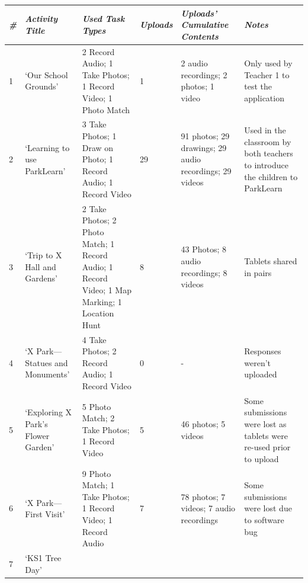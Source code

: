 \begin{table}[]
    \centering
    \begin{tabularx}{\linewidth}{ 
| p{4mm} 
| >{\raggedright\arraybackslash}X 
| >{\raggedright\arraybackslash}X 
| p{13mm}
| >{\raggedright\arraybackslash}X 
| >{\raggedright\arraybackslash}X 
|}
\hline
\small\textit{\#}
    & \small\textit{Activity Title} 
    & \small\textit{Used Task Types}
    & \small\textit{Uploads}
    & \small\textit{Uploads' Cumulative Contents}
    & \small\textit{Notes}\\
\hline
\small 1 
    & \footnotesize `Our School Grounds' 
    & \footnotesize 2 Record Audio; 1 Take Photos; 1 Record Video; 1 Photo Match 
    & \footnotesize 1  
    & \footnotesize 2 audio recordings; 2 photos; 1 video
    & \footnotesize Only used by Teacher 1 to test the application\\
\hline
\small 2
    & \footnotesize `Learning to use ParkLearn' 
    & \footnotesize 3 Take Photos; 1 Draw on Photo; 1 Record Audio; 1 Record Video 
    & \footnotesize 29  
    & \footnotesize 91 photos; 29 drawings; 29 audio recordings; 29 videos
    & \footnotesize Used in the classroom by both teachers to introduce the children to ParkLearn\\
\hline
\small 3
    & \footnotesize `Trip to X Hall and Gardens' 
    & \footnotesize 2 Take Photos; 2 Photo Match; 1 Record Audio; 1 Record Video; 1 Map Marking; 1 Location Hunt 
    & \footnotesize 8  
    & \footnotesize 43 Photos; 8 audio recordings; 8 videos
    & \footnotesize Tablets shared in pairs\\
\hline
\small 4 
    & \footnotesize `X Park---Statues and Monuments' 
    & \footnotesize 4 Take Photos; 2 Record Audio; 1 Record Video
    & \footnotesize 0  
    & \footnotesize -
    & \footnotesize Responses weren't uploaded\\
\hline
    \small 5 
    & \footnotesize `Exploring X Park's Flower Garden' 
    & \footnotesize 5 Photo Match; 2 Take Photos; 1 Record Video
    & \footnotesize 5 
    & \footnotesize 46 photos; 5 videos
    & \footnotesize Some submissions were lost as tablets were re-used prior to upload\\
\hline
    \small 6 
    & \footnotesize `X Park---First Visit' 
    & \footnotesize 9 Photo Match; 1 Take Photos; 1 Record Video; 1 Record Audio
    & \footnotesize 7 
    & \footnotesize 78 photos; 7 videos; 7 audio recordings
    & \footnotesize Some submissions were lost due to software bug\\
\hline
    \small 7 
    & \footnotesize `KS1 Tree Day' 

\end{tabularx}
\end{table}
